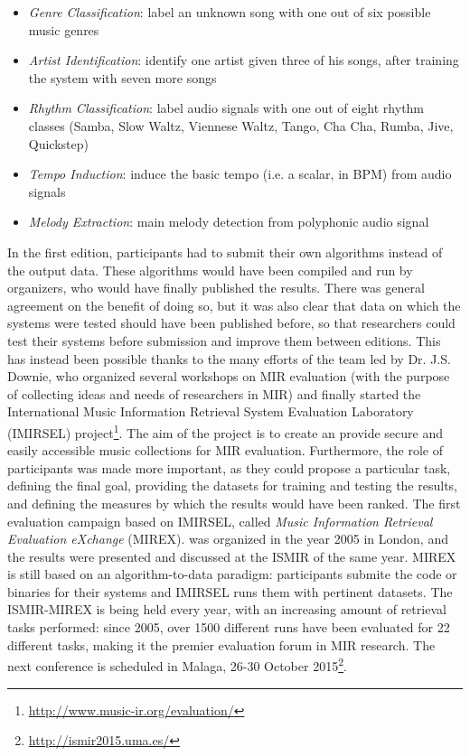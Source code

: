 \begin{itemize}
\item \textit{Genre Classification}: label an unknown song with one out of six possible music genres
\item \textit{Artist Identification}: identify one artist given three of his songs, after training the system with seven more songs 
\item \textit{Rhythm Classification}: label audio signals with one out of eight rhythm classes (Samba, Slow Waltz, Viennese Waltz, Tango, Cha Cha, Rumba, Jive, Quickstep)
\item \textit{Tempo Induction}: induce the basic tempo (i.e. a scalar, in BPM) from audio signals
\item \textit{Melody Extraction}: main melody detection from polyphonic audio signal
\end{itemize}
In the first edition, participants had to submit their own algorithms instead of the output data. These algorithms would have been compiled and run by organizers, who would have finally published the results. There was general agreement on the benefit of doing so, but it was also clear that data on which the systems were tested should have been published before, so that researchers could test their systems before submission and improve them between editions. 
This has instead been possible thanks to the many efforts of the team led by Dr. J.S. Downie, who organized several workshops on MIR evaluation (with the purpose of collecting ideas and needs of researchers in MIR) and finally started the International Music Information Retrieval System Evaluation Laboratory (IMIRSEL) project\footnote{\url{http://www.music-ir.org/evaluation/}}. The aim of the project is to create an provide secure and easily accessible music collections for MIR evaluation. Furthermore, the role of participants was made more important, as they could propose a particular task, defining the final goal, providing the datasets for training and testing the results, and defining the measures by which the results would have been ranked. The first evaluation campaign based on IMIRSEL, called \textit{Music Information Retrieval Evaluation eXchange} (MIREX). was organized in the year 2005 in London, and the results were presented and discussed at the ISMIR of the same year. MIREX is still based on an algorithm-to-data paradigm: participants submite the code or binaries for their systems and IMIRSEL runs them with pertinent datasets. The ISMIR-MIREX is being held every year, with an increasing amount of retrieval tasks performed: since 2005, over 1500 different runs have been evaluated for 22 different tasks, making it the premier evaluation forum in MIR research. The next conference is scheduled in Malaga, 26-30 October 2015\footnote{\url{http://ismir2015.uma.es/}}. 

